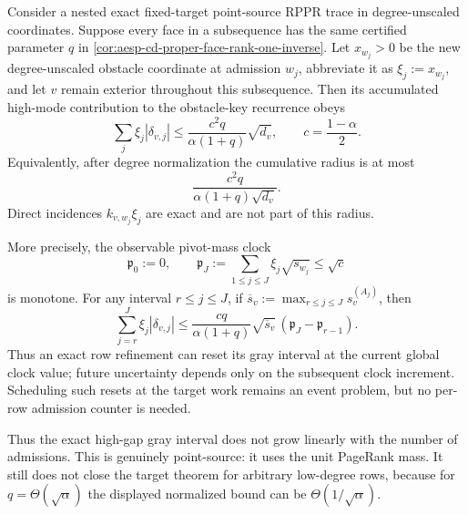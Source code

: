 \begin{corollary}
\label{cor:aesp-cd-point-source-cumulative-gray-key}
Consider a nested exact fixed-target point-source RPPR trace in
degree-unscaled coordinates.  Suppose every face in a subsequence has the
same certified parameter \(q\) in
\cref{cor:aesp-cd-proper-face-rank-one-inverse}.  Let \(x_{w_j}>0\) be the
new degree-unscaled obstacle coordinate at admission \(w_j\), abbreviate it
as \(\xi_j:=x_{w_j}\), and let \(v\) remain exterior throughout this
subsequence.  Then its accumulated high-mode contribution to the obstacle-key
recurrence obeys
\begin{equation}
 \sum_j \xi_j|\delta_{v,j}|
 \leq
 \frac{c^2q}{\alpha(1+q)}\sqrt{d_v},
 \qquad c=\frac{1-\alpha}{2}.
 \label{eq:aesp-cd-point-source-cumulative-gray-key}
\end{equation}
Equivalently, after degree normalization the cumulative radius is at most
\begin{equation*}
 \frac{c^2q}{\alpha(1+q)\sqrt{d_v}}.
\end{equation*}
Direct incidences \(k_{v,w_j}\xi_j\) are exact and are not part of this
radius.

More precisely, the observable pivot-mass clock
\begin{equation}
 \mathfrak p_0:=0,\qquad
 \mathfrak p_J:=\sum_{1\leq j\leq J}\xi_j\sqrt{s_{w_j}}
 \leq\sqrt c
 \label{eq:aesp-cd-point-source-pivot-mass-clock}
\end{equation}
is monotone.  For any interval \(r\leq j\leq J\), if
\(\overline s_v:=\max_{r\leq j\leq J}s_v^{(A_j)}\), then
\begin{equation}
 \sum_{j=r}^J\xi_j|\delta_{v,j}|
 \leq
 \frac{cq}{\alpha(1+q)}
 \sqrt{\overline s_v}\,
 (\mathfrak p_J-\mathfrak p_{r-1}).
 \label{eq:aesp-cd-point-source-clocked-gray-key}
\end{equation}
Thus an exact row refinement can reset its gray interval at the current
global clock value; future uncertainty depends only on the subsequent clock
increment.  Scheduling such resets at the target work remains an event
problem, but no per-row admission counter is needed.

Thus the exact high-gap gray interval does not grow linearly with the number
of admissions.  This is genuinely point-source: it uses the unit PageRank
mass.  It still does not close the target theorem for arbitrary low-degree
rows, because for \(q=\Theta(\sqrt\alpha)\) the displayed normalized bound
can be \(\Theta(1/\sqrt\alpha)\).
\end{corollary}

